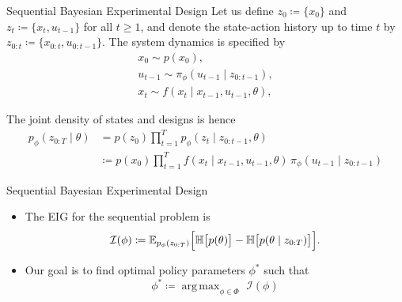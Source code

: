 \documentclass[10pt, aspectratio=1610]{beamer}
\DeclareMathOperator*{\argmax}{arg\,max}
\begin{document}
    \begin{frame}{Sequential Bayesian Experimental Design}
      Let us define $z_0 \coloneq \{x_0\}$ and $z_{t} \coloneq \{x_t, u_{t-1}\}$ for all $t \geq 1$, and denote the state-action history up to time $t$ by $z_{0:t} \coloneq \{x_{0:t}, u_{0:t-1}\}$. The system dynamics is specified by
      \begin{gather}
        x_0 \sim p(x_0), \\
        u_{t-1} \sim \pi_\phi(u_{t-1} \mid z_{0:t-1}), \\
        x_t \sim f(x_t \mid x_{t-1}, u_{t-1}, \theta),
      \end{gather}
      \pause

      \vspace{0.2cm}
      The joint density of states and designs is hence
      \begin{align}\label{eq:joint_density}
        p_{\phi}(z_{0:T} \mid \theta) &= p(z_{0}) \prod_{t=1}^T p_{\phi}(z_{t} \mid z_{0:t-1}, \theta) \\
        &\coloneq p(x_0) \prod_{t=1}^T f(x_t \mid x_{t-1}, u_{t-1}, \theta) \, \pi_\phi(u_{t-1} \mid z_{0:t-1})
      \end{align}
    \end{frame}

    \begin{frame}{Sequential Bayesian Experimental Design}
      \begin{itemize}
        \item The EIG for the sequential problem is
          \begin{equation}
            \mathcal{I}(\phi) \coloneq \mathbb{E}_{p_{\phi}(z_{0:T})} \Bigl[ \mathbb{H}\bigl[p(\theta)\bigr] - \mathbb{H}\bigl[p(\theta \mid z_{0:T})\bigr] \Bigr].
          \end{equation}
        \item Our goal is to find optimal policy parameters $\phi^*$ such that
          \begin{equation}
            \phi^* \coloneq \argmax_{\phi \in \Phi} \,\, \mathcal{I}(\phi)
          \end{equation}
      \end{itemize}
    \end{frame}
\end{document}
